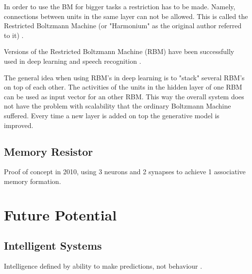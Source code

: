 \documentclass[12pt, a4paper]{article}
\begin{document}
In order to use the BM for bigger tasks a restriction has to be made. Namely, connections between units in the same layer can not be allowed. This is called the Restricted Boltzmann Machine (or "Harmonium" as the original author referred to it) \cite{smolensky1986information}.

Versions of the Restricted Boltzmann Machine (RBM) have been successfully used in deep learning \cite{hinton2012better} and speech recognition \cite{dahl2010phone}.

The general idea when using RBM's in deep learning is to "stack" several RBM's on top of each other. The activities of the units in the hidden layer of one RBM can be used as input vector for an other RBM. This way the overall system does not have the problem with scalability that the ordinary Boltzmann Machine suffered. Every time a new layer is added on top the generative model is improved.

\subsection{Memory Resistor}


Proof of concept in 2010, using 3 neurons and 2 synapses to achieve 1 associative memory formation.

%


\section{Future Potential}

%
%

%


\subsection{Intelligent Systems}

Intelligence defined by ability to make predictions, not behaviour \cite{intelligence_is_prediction}.
\end{document}
